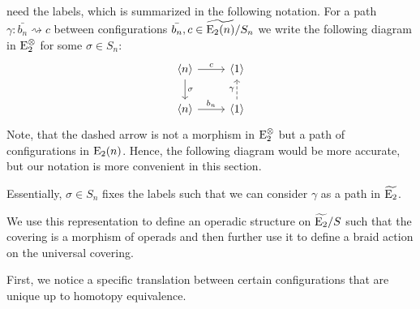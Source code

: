 \begin{const}
need the labels, which is summarized in the following notation. For a path
$\gamma \colon \bar{b_n} \rightsquigarrow c$ between configurations $\bar{b_n},
c \in \widetilde{\operatorname{E}_2(n)} \slash S_n$ we write the following diagram in $\operatorname{\operatorname{E}_2^{\otimes}}$ for some
$\sigma \in S_n$:
\[    
    \begin{tikzcd}
        \langle n \rangle \arrow[r, "c"] \arrow[d, "\sigma"] & \langle 1 \rangle  \\
        \langle n \rangle  \arrow[r, "b_n"]                  & \langle 1 \rangle  \arrow[u, dashed, "\gamma"]              
    \end{tikzcd}
\]
Note, that the dashed arrow is not a morphism in $\operatorname{\operatorname{E}_2^{\otimes}}$ but a path of
configurations in $\operatorname{E}_2(n)$. Hence, the following diagram would be more
accurate, but our notation is more convenient in this section.
\begin{center}
\end{center}
Essentially, $\sigma \in S_n$ fixes the labels such that we can consider
$\gamma$ as a path in $\widetilde{\operatorname{E}_2}$.
\end{const}

We use this representation to define an operadic structure on
$\widetilde{\operatorname{E}_2} \slash S$ such that the covering is a morphism of operads and
then further use it to define a braid action on the universal covering.

First, we notice a specific translation between certain configurations that are
unique up to homotopy equivalence.

